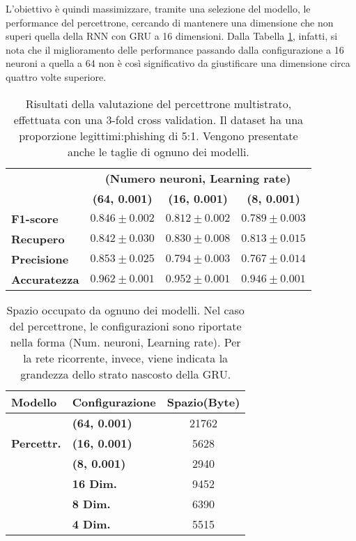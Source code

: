 \documentclass[../../main.tex]{subfiles}
\begin{document}
    L'obiettivo è quindi massimizzare, tramite una selezione del modello, le performance del percettrone, cercando di mantenere una dimensione che non superi quella della RNN con GRU a 16 dimensioni. Dalla Tabella \ref{tab:FFNNModelSelection}, infatti, si nota che il miglioramento delle performance passando dalla configurazione a 16 neuroni a quella a 64 non è così significativo da giustificare una dimensione circa quattro volte superiore.

    \begin{table}[t]
        \centering
        \begin{tabular}{lccc}
            \toprule
            {} &                      \multicolumn{3}{c}{\textbf{(Numero neuroni, Learning rate)}}\\
            {} &                      \textbf{(64, 0.001)} & \textbf{(16, 0.001)} & \textbf{(8, 0.001)} \\
            \midrule
            \textbf{F1-score }      &      $0.846 \pm 0.002$ & $0.812 \pm 0.002$ & $0.789 \pm 0.003$\\
            \textbf{Recupero   }    &      $0.842 \pm 0.030$ & $0.830 \pm 0.008$ & $0.813 \pm 0.015$\\
            \textbf{Precisione}     &      $0.853 \pm 0.025$ & $0.794 \pm 0.003$ & $0.767 \pm 0.014$\\
            \textbf{Accuratezza}    &      $0.962 \pm 0.001$ & $0.952 \pm 0.001$ & $0.946 \pm 0.001$\\
            \bottomrule            
        \end{tabular}
        \caption{Risultati della valutazione del percettrone multistrato, effettuata con una 3-fold cross validation. Il dataset ha una proporzione legittimi:phishing di 5:1. Vengono presentate anche le taglie di ognuno dei modelli.}
        \label{tab:FFNNModelSelection}
    \end{table}

    \begin{table}[ht]
        \centering
        \begin{tabular}{llc}
            \toprule
            \textbf{Modello} & \textbf{Configurazione} & \textbf{Spazio(Byte)}\\
            \midrule
            \multirow{3}{*}{\textbf{Percettr.}} & \textbf{(64, 0.001)} & 21762\\
            & \textbf{(16, 0.001)} & 5628\\
            & \textbf{(8, 0.001)} & 2940\\
            \hdashline
            \multirow{3}{*}{\textbf{RNN.}} & \textbf{16 Dim.} & 9452\\
            & \textbf{8 Dim.} & 6390\\
            & \textbf{4 Dim.} & 5515\\
            \bottomrule
        \end{tabular}
        \caption{Spazio occupato da ognuno dei modelli. Nel caso del percettrone, le configurazioni sono riportate nella forma (Num. neuroni, Learning rate). Per la rete ricorrente, invece, viene indicata la grandezza dello strato nascosto della GRU.}
        \label{tab:spazioModelli}
    \end{table}
\end{document}
